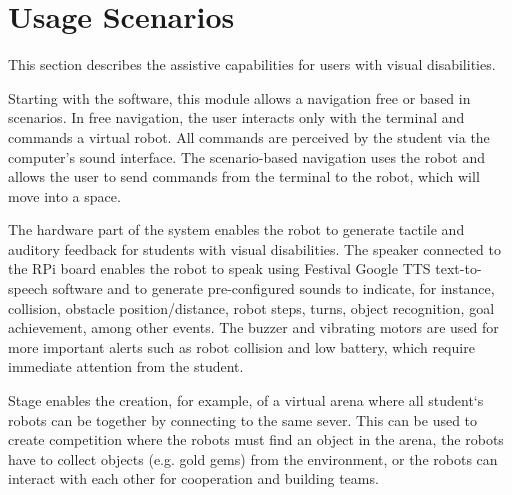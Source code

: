 \section{Usage Scenarios}
\label{sec:usage}


	
	
This section describes the assistive capabilities for users with visual disabilities. 

Starting with the software, this module allows a navigation free or based in scenarios. In free navigation, the user interacts only with the terminal and commands a virtual robot. All commands are perceived by the student via the computer's sound interface. The scenario-based navigation uses the robot and allows the user to send commands from the terminal to the robot, which will move into a space.

The hardware part of the system enables the robot to generate tactile and auditory feedback for students with visual disabilities. The speaker connected to the RPi board enables the robot to speak using Festival Google TTS text-to-speech software and to generate pre-configured sounds to indicate, for instance, collision, obstacle position/distance, robot steps, turns, object recognition, goal achievement, among other events. The buzzer and vibrating motors are used for more important alerts such as robot collision and low battery, which require immediate attention from the student.	

Stage enables the creation, for example, of a virtual arena where all student`s robots can be together by connecting to the same sever. This can be used to create competition where the robots must find an object in the arena, the robots have to collect objects (e.g. gold gems) from the environment, or the robots can interact with each other for cooperation and building teams.


